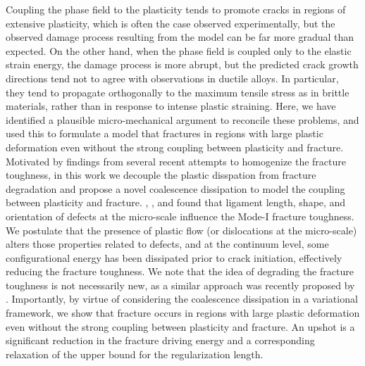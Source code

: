 Coupling the phase field to the plasticity tends to promote cracks in regions of extensive plasticity, which is often the case observed experimentally, but the observed damage process resulting from the model can be far more gradual than expected. On the other hand, when the phase field is coupled only to the elastic strain energy, the damage process is more abrupt, but the predicted crack growth directions tend not to agree with observations in ductile alloys.  In particular, they tend to propagate orthogonally to the maximum tensile stress as in brittle materials, rather than in response to intense plastic straining. Here, we have identified a plausible micro-mechanical argument to reconcile these problems, and used this to formulate a model that fractures in regions with large plastic deformation even without the strong coupling between plasticity and fracture. Motivated by findings from several recent attempts to homogenize the fracture toughness, in this work we decouple the plastic disspation from fracture degradation and propose a novel coalescence dissipation to model the coupling between plasticity and fracture. \citet{rodriguez2016silica}, \citet{chowdhury2019effects}, and \citet{vo2020molecular} found that ligament length, shape, and orientation of defects at the micro-scale influence the Mode-I fracture toughness. We postulate that the presence of plastic flow (or dislocations at the micro-scale) alters those properties related to defects, and at the continuum level, some configurational energy has been dissipated prior to crack initiation, effectively reducing the fracture toughness. We note that the idea of degrading the fracture toughness is not necessarily new, as a similar approach was recently proposed by \citet{yin2020ductile}. Importantly, by virtue of considering the coalescence dissipation in a variational framework, we show that fracture occurs in regions with large plastic deformation even without the strong coupling between plasticity and fracture.  An upshot is a significant reduction in the fracture driving energy and a corresponding relaxation of the upper bound for the regularization length.

